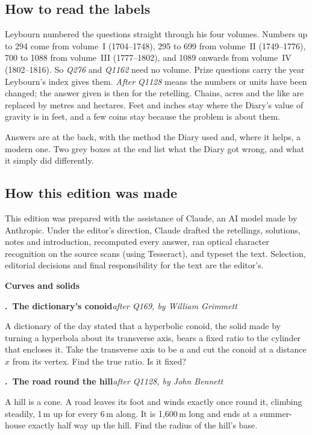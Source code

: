 \documentclass[11pt,a4paper]{article}
\newcounter{prob}
\newcommand{\prob}[3]{\par\bigskip\refstepcounter{prob}\label{#1}%
  \noindent\textbf{\theprob.\ #2}\hfill{\small\textit{#3}}\par\nopagebreak\smallskip}
\newcommand{\band}[3]{%
  \clearpage
  \begin{tcolorbox}[colback=#1!12,colframe=#1,boxrule=1pt,arc=2pt]
  {\Large\bfseries\color{#1} #2}\hfill{\large #3}
  \end{tcolorbox}}
\begin{document}
\subsection*{How to read the labels}

Leybourn numbered the questions straight through his four volumes. Numbers up to 294
come from volume~I (1704--1748), 295 to 699 from volume~II (1749--1776), 700 to 1088 from
volume~III (1777--1802), and 1089 onwards from volume~IV (1802--1816). So
\textit{Q276} and \textit{Q1162} need no volume. Prize questions carry the year Leybourn's
index gives them. \textit{After Q1128} means the numbers or units have been changed; the
answer given is then for the retelling. Chains, acres and the like are replaced by metres
and hectares. Feet and inches stay where the Diary's value of gravity is in feet, and a
few coins stay because the problem is about them.

Answers are at the back, with the method the Diary used and, where it helps, a modern
one. Two grey boxes at the end list what the Diary got wrong, and what it simply did
differently.

\subsection*{How this edition was made}
This edition was prepared with the assistance of Claude, an AI model made by Anthropic. Under the editor's direction, Claude drafted the retellings, solutions, notes and introduction, recomputed every answer, ran optical character recognition on the source scans (using Tesseract), and typeset the text. Selection, editorial decisions and final responsibility for the text are the editor's.

\band{bandpurple}{Curves and solids}{}

\prob{c-conoid}{The dictionary's conoid}{after Q169, by William Grimmett}
A dictionary of the day stated that a hyperbolic conoid, the solid made by turning a
hyperbola about its transverse axis, bears a fixed ratio to the cylinder that encloses it.
Take the transverse axis to be $a$ and cut the conoid at a distance $x$ from its vertex.
Find the true ratio. Is it fixed?

\prob{c-road}{The road round the hill}{after Q1128, by John Bennett}
A hill is a cone. A road leaves its foot and winds exactly once round it, climbing
steadily, 1\,m up for every 6\,m along. It is 1,600\,m long and ends at a summer-house
exactly half way up the hill. Find the radius of the hill's base.
\end{document}

